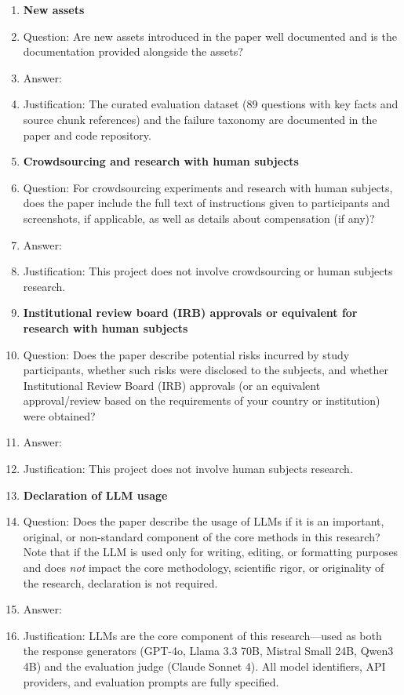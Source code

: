 \begin{enumerate}
\item {\bf New assets}
    \item[] Question: Are new assets introduced in the paper well documented and is the documentation provided alongside the assets?
    \item[] Answer: \answerYes{}
    \item[] Justification: The curated evaluation dataset (89 questions with key facts and source chunk references) and the failure taxonomy are documented in the paper and code repository.

\item {\bf Crowdsourcing and research with human subjects}
    \item[] Question: For crowdsourcing experiments and research with human subjects, does the paper include the full text of instructions given to participants and screenshots, if applicable, as well as details about compensation (if any)?
    \item[] Answer: \answerNA{}
    \item[] Justification: This project does not involve crowdsourcing or human subjects research.

\item {\bf Institutional review board (IRB) approvals or equivalent for research with human subjects}
    \item[] Question: Does the paper describe potential risks incurred by study participants, whether such risks were disclosed to the subjects, and whether Institutional Review Board (IRB) approvals (or an equivalent approval/review based on the requirements of your country or institution) were obtained?
    \item[] Answer: \answerNA{}
    \item[] Justification: This project does not involve human subjects research.

\item {\bf Declaration of LLM usage}
    \item[] Question: Does the paper describe the usage of LLMs if it is an important, original, or non-standard component of the core methods in this research? Note that if the LLM is used only for writing, editing, or formatting purposes and does \emph{not} impact the core methodology, scientific rigor, or originality of the research, declaration is not required.
    \item[] Answer: \answerYes{}
    \item[] Justification: LLMs are the core component of this research---used as both the response generators (GPT-4o, Llama 3.3 70B, Mistral Small 24B, Qwen3 4B) and the evaluation judge (Claude Sonnet 4). All model identifiers, API providers, and evaluation prompts are fully specified.

\end{enumerate}
